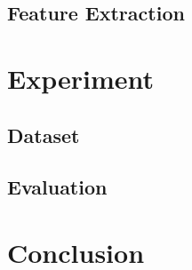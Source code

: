 \documentclass[12pt,english]{article}
\begin{document}
\subsection{Feature Extraction}
  

\section{Experiment}

\subsection{Dataset}


\subsection{Evaluation}




\section{Conclusion}

\nocite{*}

\printbibliography
\end{document}
